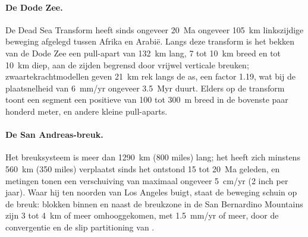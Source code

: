 \paragraph{De Dode Zee.} De Dead Sea Transform heeft sinds ongeveer
\qty{20}{Ma} ongeveer \qty{105}{km} linkszijdige beweging afgelegd tussen Afrika en Arabië.
Langs deze transform is het bekken van de Dode Zee een pull-apart van
\qty{132}{km} lang, 7 tot \qty{10}{km} breed en tot \qty{10}{km} diep, aan de zijden
begrensd door vrijwel verticale breuken; zwaartekrachtmodellen geven \qty{21}{km} rek
langs de as, een factor 1.19, wat bij de plaatsnelheid van
\qty{6}{mm/yr} ongeveer \qty{3.5}{Myr} duurt. Elders op de transform toont een
segment een positieve  van 100 tot \qty{300}{m} breed in de
bovenste paar honderd meter, en andere kleine pull-aparts.

\paragraph{De San Andreas-breuk.} Het breuksysteem is meer dan \qty{1290}{km}
(800 miles) lang; het heeft zich minstens \qty{560}{km} (350 miles) verplaatst sinds het
ontstond 15 tot \qty{20}{Ma} geleden, en metingen tonen een verschuiving van
maximaal ongeveer \qty{5}{cm/yr} (2 inch per jaar). Waar hij ten noorden van Los
Angeles buigt, staat de beweging schuin op de breuk: blokken binnen en naast de
breukzone in de San Bernardino Mountains zijn 3 tot \qty{4}{km} of meer omhooggekomen,
met \qty{1.5}{mm/yr} of meer, door de convergentie en de slip partitioning van
.

